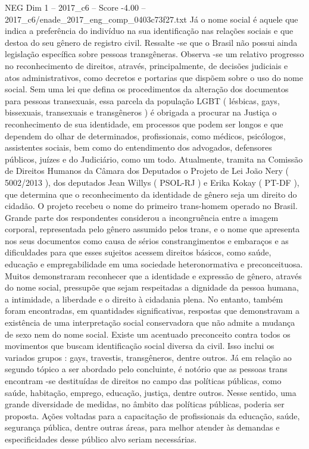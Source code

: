 \begin{textsample}{NEG Dim 1 – 2017\_c6 – Score -4.00 – 2017\_c6/enade\_2017\_eng\_comp\_0403c73f27.txt}
Já o nome social é aquele que indica a preferência do indivíduo na sua identificação nas relações sociais e que destoa do seu gênero de registro civil.
Ressalte -se que o Brasil não possui ainda legislação específica sobre pessoas transgêneras.
Observa -se um relativo progresso no reconhecimento de direitos, através, principalmente, de decisões judiciais e atos administrativos, como decretos e portarias que dispõem sobre o uso do nome social.
Sem uma lei que defina os procedimentos da alteração dos documentos para pessoas transexuais, essa parcela da população LGBT ( lésbicas, gays, bissexuais, transexuais e transgêneros ) é obrigada a procurar na Justiça o reconhecimento de sua identidade, em processos que podem ser longos e que dependem do olhar de determinados, profissionais, como médicos, psicólogos, assistentes sociais, bem como do entendimento dos advogados, defensores públicos, juízes e do Judiciário, como um todo.
Atualmente, tramita na Comissão de Direitos Humanos da Câmara dos Deputados o Projeto de Lei João Nery ( 5002/2013 ), dos deputados Jean Willys ( PSOL-RJ ) e Erika Kokay ( PT-DF ), que determina que o reconhecimento da identidade de gênero seja um direito do cidadão.
O projeto recebeu o nome do primeiro trans-homem operado no Brasil.
Grande parte dos respondentes considerou a incongruência entre a imagem corporal, representada pelo gênero assumido pelos trans, e o nome que apresenta nos seus documentos como causa de sérios constrangimentos e embaraços e as dificuldades para que esses sujeitos acessem direitos básicos, como saúde, educação e empregabilidade em uma sociedade heteronormativa e preconceituosa.
Muitos demonstraram reconhecer que a identidade e expressão de gênero, através do nome social, pressupõe que sejam respeitadas a dignidade da pessoa humana, a intimidade, a liberdade e o direito à cidadania plena.
No entanto, também foram encontradas, em quantidades significativas, respostas que demonstravam a existência de uma interpretação social conservadora que não admite a mudança de sexo nem do nome social.
Existe um acentuado preconceito contra todos os movimentos que buscam identificação social diversa da civil.
Isso inclui os variados grupos : gays, travestis, transgêneros, dentre outros.
Já em relação ao segundo tópico a ser abordado pelo concluinte, é notório que as pessoas trans encontram -se destituídas de direitos no campo das políticas públicas, como saúde, habitação, emprego, educação, justiça, dentre outros.
Nesse sentido, uma grande diversidade de medidas, no âmbito das políticas públicas, poderia ser proposta.
Ações voltadas para a capacitação de profissionais da educação, saúde, segurança pública, dentre outras áreas, para melhor atender às demandas e especificidades desse público alvo seriam necessárias.

\end{textsample}
